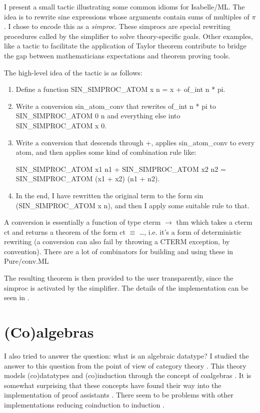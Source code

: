 \documentclass[notitlepage]{article}
\begin{document}
I present a small tactic illustrating some common idioms for Isabelle/ML. The idea is to rewrite sine expressions whose arguments contain sums of multiples of $\pi$. I chose to encode this as a \textit{simproc}. These simprocs are special rewriting procedures called by the simplifier to solve theory-specific goals. Other examples, like a tactic to facilitate the application of Taylor theorem contribute to bridge the gap between mathematicians expectations and theorem proving tools. 

The high-level idea of the tactic \cite{sines} is as follows:

\begin{enumerate}
\item Define a function SIN\_SIMPROC\_ATOM x n = x + of\_int n * pi.
\item Write a conversion sin\_atom\_conv that rewrites of\_int n * pi to SIN\_SIMPROC\_ATOM 0 n and everything else into SIN\_SIMPROC\_ATOM x 0. 
\item Write a conversion that descends through +, applies sin\_atom\_conv to every atom, and then applies some kind of combination rule like:

 SIN\_SIMPROC\_ATOM x1 n1 + SIN\_SIMPROC\_ATOM x2 n2 = \\
 SIN\_SIMPROC\_ATOM (x1 + x2) (n1 + n2).
\item In the end, I have rewritten the original term to the form sin (SIN\_SIMPROC\_ATOM x n), and then I apply some suitable rule to that.
\end{enumerate}

A conversion is essentially a function of type cterm $\to$ thm which takes a cterm ct and returns a theorem of the form ct $\equiv$ …, i.e. it's a form of deterministic rewriting (a conversion can also fail by throwing a CTERM exception, by convention). There are a lot of combinators for building and using these in Pure/conv.ML

The resulting theorem is then provided to the user transparently, since the simproc is activated by the simplifier. The details of the implementation can be seen in \cite{sineimplementation}.

\section{(Co)algebras}

I also tried to answer the question: what is an algebraic datatype? I studied the answer to this question from the point of view of category theory \cite{barr1990category}. This theory models (co)datatypes and (co)induction through the concept of coalgebras \cite{smyth1982category} \cite{denecke2009universal} \cite{rutten}. It is somewhat surprising that these concepts have found their way into the implementation of proof assistants \cite{traytel} \cite{blanchette2014cardinals}. There seem to be problems with other implementations reducing coinduction to induction \cite{blanchette2015foundational} \cite{coq1} \cite{coq2} \cite{coq3}. 
\end{document}
